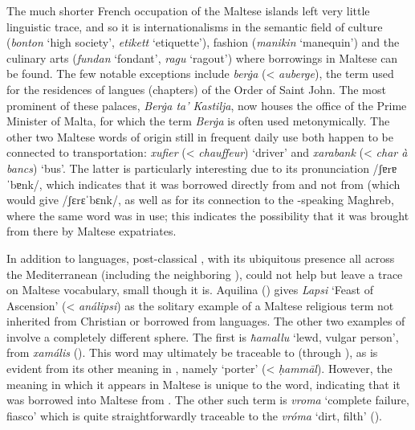 \documentclass[output=paper]{langsci/langscibook}
\begin{document}
The much shorter French occupation of the Maltese islands left very little linguistic trace, and so it is internationalisms in the semantic field of culture (\textit{bonton} `high society', \textit{etikett} `etiquette'), fashion (\textit{manikin} `manequin') and the culinary arts (\textit{fundan} `fondant', \textit{ragu} `ragout') where  borrowings in Maltese can be found. The few notable exceptions include \textit{berġa} (< \textit{auberge}), the term used for the residences of langues (chapters) of the Order of Saint John. The most prominent of these palaces, \textit{Berġa ta' Kastilja}, now houses the office of the Prime Minister of Malta, for which the term \textit{Berġa} is often used metonymically. The other two Maltese words of  origin still in frequent daily use both happen to be connected to transportation: \textit{xufier} (< \textit{chauffeur}) `driver' and \textit{xarabank} (< \textit{char à bancs}) `bus'. The latter is particularly interesting due to its pronunciation /ʃɐrɐˈbɐnk/, which indicates that it was borrowed directly from  and not from  (which would give /ʃɛrɛˈbɛnk/, as well as for its connection to the -speaking Maghreb, where the same word was in use; this indicates the possibility that it was brought from there by Maltese expatriates.

In addition to  languages, post-classical , with its ubiquitous presence all across the Mediterranean (including the neighboring ), could not help but leave a trace on Maltese vocabulary, small though it is. Aquilina (\citeyear[23]{aquilina1976}) gives \textit{Lapsi} `Feast of Ascension' (< \textit{análipsi}) as the solitary example of a Maltese religious term not inherited from Christian  or borrowed from  languages. The other two examples of   involve a completely different sphere. The first is \textit{ħamallu} `lewd, vulgar person', from  \textit{xamális} (\citealt[7781]{megaleksikon1958}). This word may ultimately be traceable to  (through ), as is evident from its other meaning in , namely `porter' (< \textit{ḥammāl}). However, the meaning in which it appears in Maltese is unique to the  word, indicating that it was borrowed into Maltese from . The other such term is \textit{vroma} `complete failure, fiasco' which is quite straightforwardly traceable to the  \textit{vróma} `dirt, filth' (\citealt[1506, 1516]{megaleksikon1958}).
\end{document}
